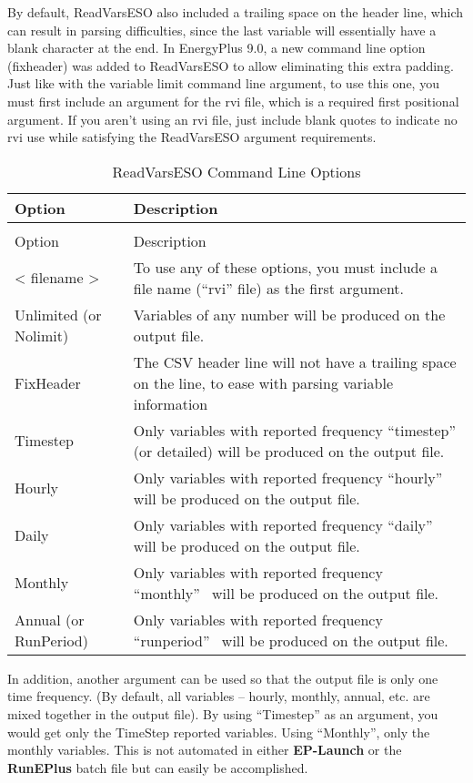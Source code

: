 By default, ReadVarsESO also included a trailing space on the header line, which can result in parsing difficulties, since the last variable will essentially have a blank character at the end.  In EnergyPlus 9.0, a new command line option (fixheader) was added to ReadVarsESO to allow eliminating this extra padding.  Just like with the variable limit command line argument, to use this one, you must first include an argument for the rvi file, which is a required first positional argument.  If you aren't using an rvi file, just include blank quotes to indicate no rvi use while satisfying the ReadVarsESO argument requirements.

\begin{longtable}[c]{p{1.5in}p{4.5in}}
\caption{ReadVarsESO Command Line Options \label{table:readvarseso-command-line-options}} \tabularnewline
\toprule 
Option & Description \tabularnewline
\midrule
\endfirsthead

\caption[]{ReadVarsESO Command Line Options} \tabularnewline
\toprule 
Option & Description \tabularnewline
\midrule
\endhead

< filename > & To use any of these options, you must include a file name (“rvi” file) as the first argument. \tabularnewline
Unlimited (or Nolimit) & Variables of any number will be produced on the output file. \tabularnewline
FixHeader & The CSV header line will not have a trailing space on the line, to ease with parsing variable information \tabularnewline
Timestep & Only variables with reported frequency “timestep” (or detailed) will be produced on the output file. \tabularnewline
Hourly & Only variables with reported frequency “hourly”~ will be produced on the output file. \tabularnewline
Daily & Only variables with reported frequency “daily”~ will be produced on the output file. \tabularnewline
Monthly & Only variables with reported frequency “monthly”~ will be produced on the output file. \tabularnewline
Annual (or RunPeriod) & Only variables with reported frequency “runperiod”~ will be produced on the output file. \tabularnewline
\bottomrule
\end{longtable}

In addition, another argument can be used so that the output file is only one time frequency. (By default, all variables -- hourly, monthly, annual, etc. are mixed together in the output file). By using ``Timestep'' as an argument, you would get only the TimeStep reported variables. Using ``Monthly'', only the monthly variables. This is not automated in either \textbf{EP-Launch} or the \textbf{RunEPlus} batch file but can easily be accomplished.

